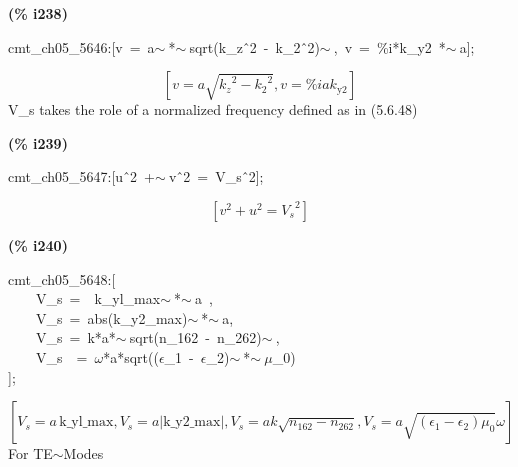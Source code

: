 \documentclass[fleqn]{article}
\begin{document}
\noindent
\begin{minipage}[t]{4.000000em}\color{red}\bfseries
(\% i238)	
\end{minipage}
\begin{minipage}[t]{\textwidth}\color{blue}
cmt\_ch05\_5646:[v\ =\ a\ensuremath{\sim\ }*\ensuremath{\sim\ }sqrt(k\_z\^\ 2\ -\ k\_2\^\ 2)\ensuremath{\sim\ },\ v\ =\ \%i*k\_y2\ *\ensuremath{\sim\ }a];
\end{minipage}
\[\displaystyle \tag{\% o238} 
\left[ v=a \sqrt{{{{k_z}}^{2}}-{{{k_2}}^{2}}}\operatorname{,}v=\% i a {k_{\ensuremath{\mathrm{y2}}}}\right] \mbox{}
\]
V\_s takes the role of a normalized frequency  defined as in (5.6.48)


\noindent
\begin{minipage}[t]{4.000000em}\color{red}\bfseries
(\% i239)	
\end{minipage}
\begin{minipage}[t]{\textwidth}\color{blue}
cmt\_ch05\_5647:[u\^\ 2\ +\ensuremath{\sim\ }v\^\ 2\ =\ V\_s\^\ 2];
\end{minipage}
\[\displaystyle \tag{\% o239} 
\left[ {{v}^{2}}+{{u}^{2}}={{{V_s}}^{2}}\right] \mbox{}
\]


\noindent
\begin{minipage}[t]{4.000000em}\color{red}\bfseries
(\% i240)	
\end{minipage}
\begin{minipage}[t]{\textwidth}\color{blue}
cmt\_ch05\_5648:[\\
\ \ \ \ V\_s\ =\ \ k\_yl\_max\ensuremath{\sim\ }*\ensuremath{\sim\ }a\ ,\\
\ \ \ \ V\_s\ =\ abs(k\_y2\_max)\ensuremath{\sim\ }*\ensuremath{\sim\ }a,\\
\ \ \ \ V\_s\ =\ k*a*\ensuremath{\sim\ }sqrt(n\_162\ -\ n\_262)\ensuremath{\sim\ },\ \\
\ \ \ \ V\_s\ \ =\ \ensuremath{\omega}*a*sqrt((\ensuremath{\epsilon}\_1\ -\ \ensuremath{\epsilon}\_2)\ensuremath{\sim\ }*\ensuremath{\sim\ }\ensuremath{\mu}\_0)\\
];
\end{minipage}
\[\displaystyle \tag{\% o240} 
\left[ {V_s}=a\, \ensuremath{\mathrm{k\_ yl\_ max}}\operatorname{,}{V_s}=a \left| \ensuremath{\mathrm{k\_ y2\_ max}}\right| \operatorname{,}{V_s}=a k \sqrt{{n_{\ensuremath{\mathrm{162}}}}-{n_{\ensuremath{\mathrm{262}}}}}\operatorname{,}{V_s}=a \sqrt{\left( {{\epsilon }_1}-{{\epsilon }_2}\right)  {{\mu }_0}} \omega \right] \mbox{}
\]
For TE\ensuremath{\sim }Modes
\end{document}
